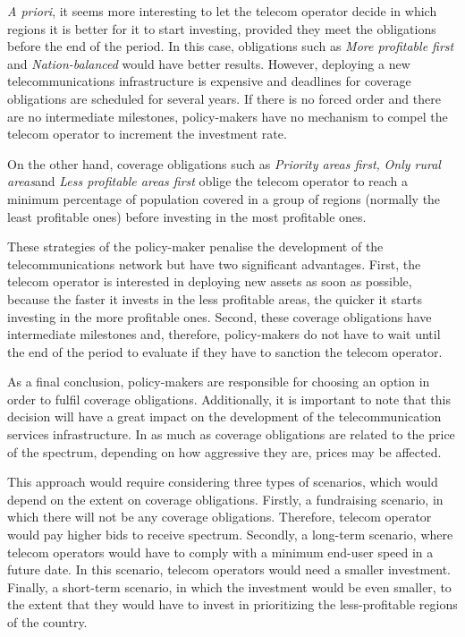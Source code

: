 \textit{A priori}, it seems more interesting to let the telecom operator decide in which regions it is better for it to start investing, provided they meet the obligations before the end of the period. In this case, obligations such as \textit{\guillemotleft More profitable first\guillemotright } and \textit{\guillemotleft Nation-balanced\guillemotright } would have better results. However, deploying a new telecommunications infrastructure is expensive and deadlines for coverage obligations are scheduled for several years. If there is no forced order and there are no intermediate milestones, policy-makers have no mechanism to compel the telecom operator to increment the investment rate.\par

On the other hand, coverage obligations such as \textit{\guillemotleft Priority areas first\guillemotright ,} \textit{\guillemotleft Only rural areas\guillemotright  }and\textit{ \guillemotleft Less profitable areas first\guillemotright } oblige the telecom operator to reach a minimum percentage of population covered in a group of regions (normally the least profitable ones) before investing in the most profitable ones.\par

These strategies of the policy-maker penalise the development of the telecommunications network but have two significant advantages. First, the telecom operator is interested in deploying new assets as soon as possible, because the faster it invests in the less profitable areas, the quicker it starts investing in the more profitable ones. Second, these coverage obligations have intermediate milestones and, therefore, policy-makers do not have to wait until the end of the period to evaluate if they have to sanction the telecom operator.\par

As a final conclusion, policy-makers are responsible for choosing an option in order to fulfil coverage obligations. Additionally, it is important to note that this decision will have a great impact on the development of the telecommunication services infrastructure. In as much as coverage obligations are related to the price of the spectrum, depending on how aggressive they are, prices may be affected. \par

This approach would require considering three types of scenarios, which would depend on the extent on coverage obligations. Firstly, a fundraising scenario, in which there will not be any coverage obligations. Therefore, telecom operator would pay higher bids to receive spectrum. Secondly, a long-term scenario, where telecom operators would have to comply with a minimum end-user speed in a future date. In this scenario, telecom operators would need a smaller investment. Finally, a short-term scenario, in which the investment would be even smaller, to the extent that they would have to invest in prioritizing the less-profitable regions of the country.\par



